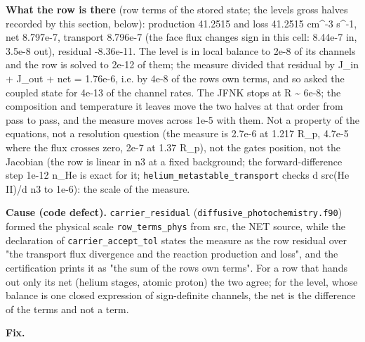 \documentclass[english,a4paper]{my_memo}
\begin{document}
\textbf{What the row is there} (row terms of the stored state; the level\textquotesingle s gross
halves recorded by this section, below): production 41.2515 and loss 41.2515
cm\^{}-3 s\^{}-1, net 8.797e-7, transport 8.796e-7 (the face flux changes sign in
this cell: 8.44e-7 in, 3.5e-8 out), residual -8.36e-11. The level is in local
balance to 2e-8 of its channels and the row is solved to 2e-12 of them; the
measure divided that residual by \textbar J\_in\textbar{} + \textbar J\_out\textbar{} + \textbar net\textbar{} = 1.76e-6, i.e. by
4e-8 of the row\textquotesingle s own terms, and so asked the coupled state for 4e-13 of the
channel rates. The JFNK stops at \textbar\textbar R\textbar\textbar{} \textasciitilde{} 6e-8; the composition and
temperature it leaves move the two halves at that order from pass to pass,
and the measure moves across 1e-5 with them. Not a property of the equations,
not a resolution question (the measure is 2.7e-6 at 1.217 R\_p, 4.7e-5
where the flux crosses zero, 2e-7 at 1.37 R\_p), not the gate\textquotesingle s position, not
the Jacobian (the row is linear in n3 at a fixed background; the
forward-difference step 1e-12 n\_He is exact for it; \texttt{helium\_metastable\_transport}
checks d src(He II)/d n3 to 1e-6): the scale of the measure.

\textbf{Cause (code defect).} \texttt{carrier\_residual} (\texttt{diffusive\_photochemistry.f90})
formed the physical scale \texttt{row\_terms\_phys} from \textbar src\textbar, the NET source, while
the declaration of \texttt{carrier\_accept\_tol} states the measure as the row residual
over "the transport flux divergence and the reaction production and loss",
and the certification prints it as "the sum of the row\textquotesingle s own terms". For a
row that hands out only its net (helium stages, atomic proton) the two agree;
for the level, whose balance is one closed expression of sign-definite
channels, the net is the difference of the terms and not a term.

\textbf{Fix.}
\end{document}
